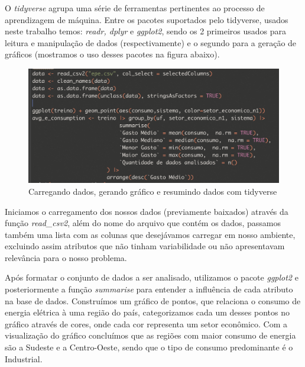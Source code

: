 \documentclass[12pt]{article}
\begin{document}
O \textit{tidyverse} agrupa uma série de ferramentas pertinentes ao processo de aprendizagem de máquina. Entre os pacotes suportados pelo tidyverse, usados neste trabalho temos: \textit{readr, dplyr} e  \textit{ggplot2}, sendo os 2 primeiros usados para leitura e manipulação de dados (respectivamente) e o segundo para a geração de gráficos (mostramos o uso desses pacotes na figura abaixo).
\begin{figure}[!h]
\centering
\includegraphics[width=1\textwidth]{images/tidyverse.png}
\caption{Carregando dados, gerando gráfico e resumindo dados com  tidyverse}
\label{fig:exampleFig1}
\end{figure}

Iniciamos o carregamento dos nossos dados (previamente baixados) através da função \textit{read\_csv2}, além do nome do arquivo que contém os dados, passamos também uma lista com as colunas que desejávamos carregar em nosso ambiente, excluindo assim atributos que não tinham variabilidade ou não apresentavam relevância para o nosso problema. 


Após formatar o conjunto de dados a ser analisado, utilizamos o pacote \textit{ggplot2} e posteriormente a função \textit{summarise} para entender a influência de cada atributo na base de dados.
Construímos um gráfico de pontos, que relaciona o consumo  de energia elétrica à uma região do país, categorizamos cada um desses pontos no gráfico através de cores, onde cada cor representa um setor econômico. Com a visualização do gráfico concluímos que as regiões com maior consumo de energia são a Sudeste e a Centro-Oeste, sendo que o tipo de consumo predominante é o Industrial.
\end{document}
